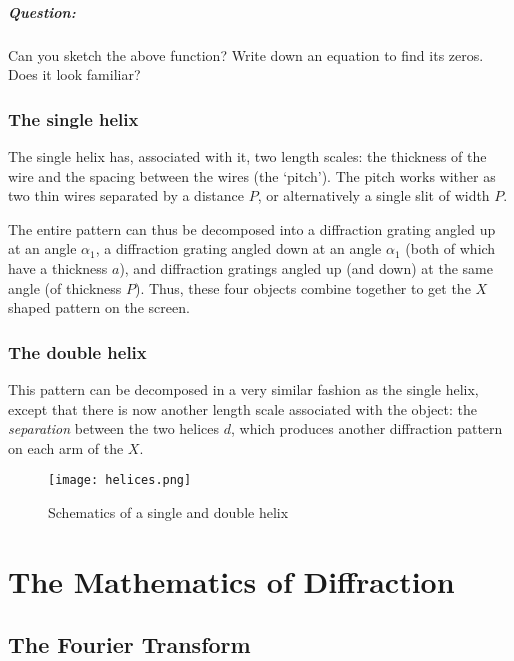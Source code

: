 \begin{tcolorbox}
\paragraph{Question: } Can you sketch the above function? Write down an equation to find its zeros. Does it look familiar?
\end{tcolorbox}

\subsection{The single helix}

The single helix has, associated with it, two length scales: the thickness of the wire and the spacing between the wires (the `pitch'). The pitch works wither as two thin wires separated by a distance $P$, or alternatively a single slit of width $P$.

The entire pattern can thus be decomposed into a diffraction grating angled up at an angle $\alpha_1$, a diffraction grating angled down at an angle $\alpha_1$ (both of which have a thickness $a$), and diffraction gratings angled up (and down) at the same angle (of thickness $P$). Thus, these four objects combine together to get the $X$ shaped pattern on the screen.

\subsection{The double helix}

This pattern can be decomposed in a very similar fashion as the single helix, except that there is now another length scale associated with the object: the \textit{separation} between the two helices $d$, which produces another diffraction pattern on each arm of the $X$.



\begin{figure}[!htb]
\centering
\texttt{[image: helices.png]}
\caption{Schematics of a single and double helix}
\label{helix}
\end{figure}

\chapter{The Mathematics of Diffraction}

\section{The Fourier Transform}

